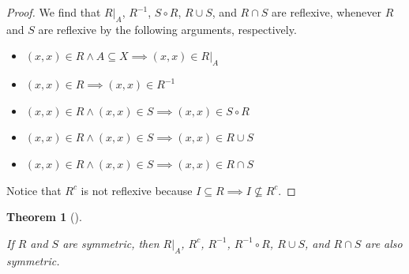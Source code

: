 \documentclass[
  letterpaper,
  10pt,
  reqno,
  twopage,
  openany]{book}
\providecommand{\tightlist}{%
  \setlength{\itemsep}{0pt}\setlength{\parskip}{0pt}}\usepackage{longtable,booktabs,array}
\theoremstyle{plain}
\theoremstyle{definition}
\theoremstyle{definition}
\theoremstyle{definition}
\theoremstyle{plain}
\theoremstyle{plain}
\newtheorem{theorem}{Theorem}[chapter]
\theoremstyle{remark}
\begin{document}
\begin{proof}

We find that \(R|_A\), \(R^{-1}\), \(S\circ R\), \(R\cup S\), and
\(R\cap S\) are reflexive, whenever \(R\) and \(S\) are reflexive by the
following arguments, respectively.

\begin{itemize}
\tightlist
\item
  \((x,x)\in R \land A\subseteq X \implies (x,x)\in R|_{A}\)
\item
  \((x,x)\in R \implies (x,x)\in R^{-1}\)
\item
  \((x,x)\in R \land (x,x)\in S \implies (x,x)\in S\circ R\)
\item
  \((x,x)\in R \land (x,x)\in S \implies (x,x)\in R\cup S\)
\item
  \((x,x)\in R \land (x,x)\in S \implies (x,x)\in R\cap S\)
\end{itemize}

Notice that \(R^c\) is not reflexive because
\(I\subseteq R\implies I\not\subseteq R^c.\)

\end{proof}

\leavevmode{}%
\begin{theorem}[]\label{thm-symmetric}

If \(R\) and \(S\) are symmetric, then \(R|_A\), \(R^c\), \(R^{-1}\),
\(R^{-1}\circ R\), \(R\cup S\), and \(R\cap S\) are also symmetric.

\end{theorem}
\end{document}
